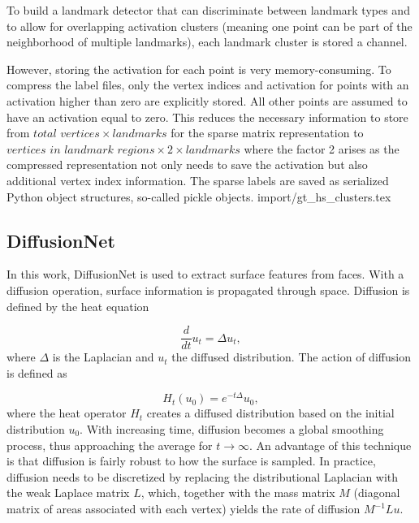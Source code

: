 \documentclass[class=article, crop=false]{standalone}
\begin{document}
To build a landmark detector that can discriminate between landmark types and to allow for overlapping activation clusters (meaning one point can be part of the neighborhood of multiple landmarks), each landmark cluster is stored a channel.

However, storing the activation for each point is very memory-consuming. To compress the label files, only the vertex indices and activation for points with an activation higher than zero are explicitly stored. All other points are assumed to have an activation equal to zero. This reduces the necessary information to store from $\textit{total vertices} \times \textit{}{landmarks}$ for the sparse matrix representation to $\textit{vertices in landmark regions} \times \textit{2} \times \textit{landmarks}$ where the factor 2 arises as the compressed representation not only needs to save the activation but also additional vertex index information. The sparse labels are saved as serialized Python object structures, so-called pickle objects.
{import/gt_hs_clusters.tex}


\subsection{DiffusionNet}
In this work, DiffusionNet \cite{sharp2022diffusion} is used to extract surface features from faces. With a diffusion operation, surface information is propagated through space. Diffusion is defined by the heat equation 

\begin{equation}
    \frac{d}{dt}u_t = \Delta u_t,
\end{equation}
where $\Delta$ is the Laplacian and $u_t$ the diffused distribution. The action of diffusion is defined as 

\begin{equation}
    H_t(u_0) = e^{-t\Delta}u_0,
\end{equation}
where the heat operator $H_t$ creates a diffused distribution based on the initial distribution $u_0$. With increasing time, diffusion becomes a global smoothing process, thus approaching the average for $t \to \infty$. An advantage of this technique is that diffusion is fairly robust to how the surface is sampled. In practice, diffusion needs to be discretized by replacing the distributional Laplacian with the weak Laplace matrix $L$, which, together with the mass matrix $M$ (diagonal matrix of areas associated with each vertex) yields the rate of diffusion $M^{-1}Lu$.
\end{document}
